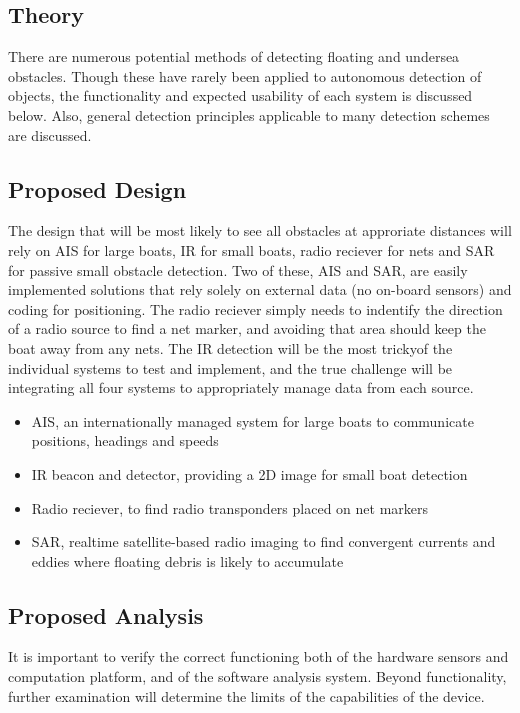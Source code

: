 \subsection{\label{sec:method:theory}Theory}
There are numerous potential methods of detecting floating and undersea obstacles. Though these have rarely been applied to autonomous detection of objects, the functionality and expected usability of each system is discussed below. Also, general detection principles applicable to many detection schemes are discussed.


\subsection{\label{sec:method:proposed-design}Proposed Design}
The design that will be most likely to see all obstacles at approriate distances will rely on AIS for large boats, IR for small boats, radio reciever for nets and SAR for passive small obstacle detection. Two of these, AIS and SAR, are easily implemented solutions that rely solely on external data (no on-board sensors) and coding for positioning. The radio reciever simply needs to indentify the direction of a radio source to find a net marker, and avoiding that area should keep the boat away from any nets. The IR detection will be the most trickyof the individual systems to test and implement, and the true challenge will be integrating all four systems to appropriately manage data from each source.


\begin{itemize}
\item AIS, an internationally managed system for large boats to communicate positions, headings and speeds
\item IR beacon and detector, providing a 2D image for small boat detection
\item Radio reciever, to find radio transponders placed on net markers
\item SAR, realtime satellite-based radio imaging to find convergent currents and eddies where floating debris is likely to accumulate
\end{itemize}



\subsection{\label{sec:method:proposed-analysis}Proposed Analysis}
It is important to verify the correct functioning both of the hardware sensors and computation platform, and of the software analysis system. Beyond functionality, further examination will determine the limits of the capabilities of the device.

